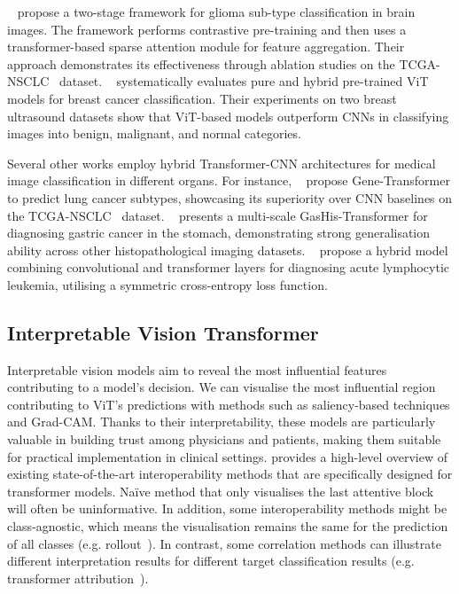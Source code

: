 \documentclass[dvipsnames]{article}
\renewcommand{\cite}[1]{\autocite{#1}}
\begin{document}
\citeauthor{lu2021smile}~\cite{lu2021smile} propose a two-stage framework for glioma sub-type classification in brain images. The framework performs contrastive pre-training and then uses a transformer-based sparse attention module for feature aggregation. Their approach demonstrates its effectiveness through ablation studies on the TCGA-NSCLC~\cite{napel2014nsclc} dataset.
\citeauthor{gheflati2021vision}~\cite{gheflati2021vision} systematically evaluates pure and hybrid pre-trained ViT models for breast cancer classification. Their experiments on two breast ultrasound datasets show that ViT-based models outperform CNNs in classifying images into benign, malignant, and normal categories.

Several other works employ hybrid Transformer-CNN architectures for medical image classification in different organs. For instance, \citeauthor{khan2021gene}~\cite{khan2021gene} propose Gene-Transformer to predict lung cancer subtypes, showcasing its superiority over CNN baselines on the TCGA-NSCLC~\cite{napel2014nsclc} dataset. \citeauthor{chen2021gashis}~\cite{chen2021gashis} presents a multi-scale GasHis-Transformer for diagnosing gastric cancer in the stomach, demonstrating strong generalisation ability across other histopathological imaging datasets. \citeauthor{jiang2021method}~\cite{jiang2021method} propose a hybrid model combining convolutional and transformer layers for diagnosing acute lymphocytic leukemia, utilising a symmetric cross-entropy loss function.






\subsection{Interpretable Vision Transformer}


Interpretable vision models aim to reveal the most influential features contributing to a model's decision.
We can visualise the most influential region contributing to ViT's predictions with methods such as saliency-based techniques and Grad-CAM.
Thanks to their interpretability, these models are particularly valuable in building trust among physicians and patients, making them suitable for practical implementation in clinical settings.
 provides a high-level overview of existing state-of-the-art interoperability methods that are specifically designed for transformer models.
Na\"ive method that only visualises the last attentive block will often be uninformative.
In addition, some interoperability methods might be class-agnostic, which means the visualisation remains the same for the prediction of all classes (e.g. rollout~\cite{abnar2020quantifying}).
In contrast, some correlation methods can illustrate different interpretation results for different target classification results (e.g. transformer attribution~\cite{chefer2021transformer}).
\end{document}
